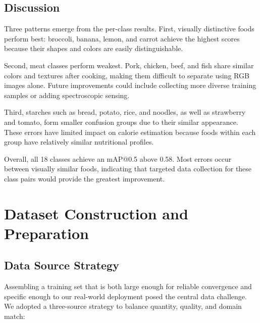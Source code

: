 \documentclass[11pt,a4paper]{article}
\begin{document}
\subsection{Discussion}

Three patterns emerge from the per-class results. First, visually distinctive foods perform best: broccoli, banana, lemon, and carrot achieve the highest scores because their shapes and colors are easily distinguishable.

Second, meat classes perform weakest. Pork, chicken, beef, and fish share similar colors and textures after cooking, making them difficult to separate using RGB images alone. Future improvements could include collecting more diverse training samples or adding spectroscopic sensing.

Third, starches such as bread, potato, rice, and noodles, as well as strawberry and tomato, form smaller confusion groups due to their similar appearance. These errors have limited impact on calorie estimation because foods within each group have relatively similar nutritional profiles.

Overall, all 18 classes achieve an mAP@0.5 above 0.58. Most errors occur between visually similar foods, indicating that targeted data collection for these class pairs would provide the greatest improvement.

\section{Dataset Construction and Preparation}

\subsection{Data Source Strategy}

Assembling a training set that is both large enough for reliable convergence and specific enough to our real-world deployment posed the central data challenge. We adopted a three-source strategy to balance quantity, quality, and domain match:
\end{document}
